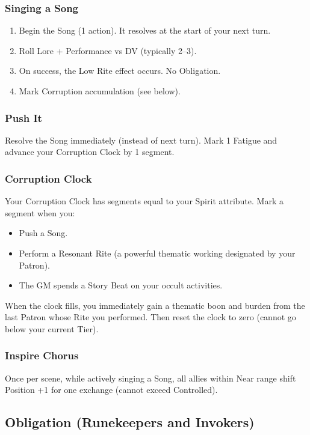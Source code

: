 \subsubsection{Singing a Song}
\begin{enumerate}
  \item Begin the Song (1 action). It resolves at the start of your next turn.
  \item Roll Lore + Performance vs DV (typically 2–3).
  \item On success, the Low Rite effect occurs. No Obligation.
  \item Mark Corruption accumulation (see below).
\end{enumerate}

\subsubsection{Push It}
Resolve the Song immediately (instead of next turn). Mark 1 Fatigue and advance your Corruption Clock by 1 segment.

\subsubsection{Corruption Clock}
Your Corruption Clock has segments equal to your Spirit attribute. Mark a segment when you:
\begin{itemize}
  \item Push a Song.
  \item Perform a Resonant Rite (a powerful thematic working designated by your Patron).
  \item The GM spends a Story Beat on your occult activities.
\end{itemize}

When the clock fills, you immediately gain a thematic boon and burden from the last Patron whose Rite you performed. Then reset the clock to zero (cannot go below your current Tier).

\subsubsection{Inspire Chorus}
Once per scene, while actively singing a Song, all allies within Near range shift Position +1 for one exchange (cannot exceed Controlled).

\subsection{Obligation (Runekeepers and Invokers)}

